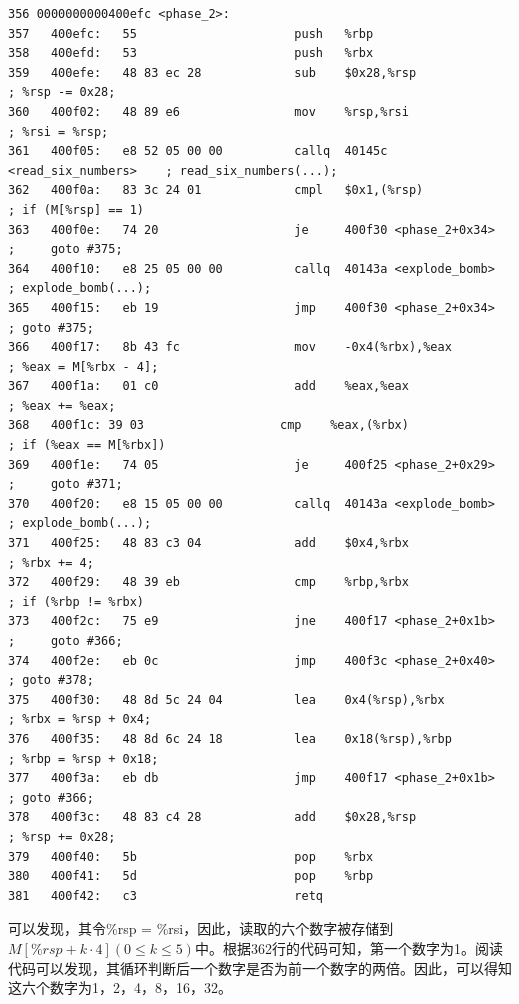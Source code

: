\documentclass{article}
\begin{document}
\begin{lstlisting}[title = phase\_2反汇编代码及注释, xleftmargin = 2em,xrightmargin = 2em, aboveskip = 1em, numbers = none, basicstyle=\footnotesize\ttfamily]
356 0000000000400efc <phase_2>:
357   400efc:   55                      push   %rbp
358   400efd:   53                      push   %rbx
359   400efe:   48 83 ec 28             sub    $0x28,%rsp                   ; %rsp -= 0x28;
360   400f02:   48 89 e6                mov    %rsp,%rsi                    ; %rsi = %rsp;
361   400f05:   e8 52 05 00 00          callq  40145c <read_six_numbers>    ; read_six_numbers(...);
362   400f0a:   83 3c 24 01             cmpl   $0x1,(%rsp)                  ; if (M[%rsp] == 1)
363   400f0e:   74 20                   je     400f30 <phase_2+0x34>        ;     goto #375;
364   400f10:   e8 25 05 00 00          callq  40143a <explode_bomb>        ; explode_bomb(...);
365   400f15:   eb 19                   jmp    400f30 <phase_2+0x34>        ; goto #375;
366   400f17:   8b 43 fc                mov    -0x4(%rbx),%eax              ; %eax = M[%rbx - 4];
367   400f1a:   01 c0                   add    %eax,%eax                    ; %eax += %eax;
368   400f1c: 39 03                   cmp    %eax,(%rbx)                  ; if (%eax == M[%rbx])
369   400f1e:   74 05                   je     400f25 <phase_2+0x29>        ;     goto #371;
370   400f20:   e8 15 05 00 00          callq  40143a <explode_bomb>        ; explode_bomb(...);
371   400f25:   48 83 c3 04             add    $0x4,%rbx                    ; %rbx += 4;
372   400f29:   48 39 eb                cmp    %rbp,%rbx                    ; if (%rbp != %rbx)
373   400f2c:   75 e9                   jne    400f17 <phase_2+0x1b>        ;     goto #366;
374   400f2e:   eb 0c                   jmp    400f3c <phase_2+0x40>        ; goto #378;
375   400f30:   48 8d 5c 24 04          lea    0x4(%rsp),%rbx               ; %rbx = %rsp + 0x4;
376   400f35:   48 8d 6c 24 18          lea    0x18(%rsp),%rbp              ; %rbp = %rsp + 0x18;
377   400f3a:   eb db                   jmp    400f17 <phase_2+0x1b>        ; goto #366;
378   400f3c:   48 83 c4 28             add    $0x28,%rsp                   ; %rsp += 0x28;
379   400f40:   5b                      pop    %rbx
380   400f41:   5d                      pop    %rbp
381   400f42:   c3                      retq
\end{lstlisting}

可以发现，其令\%rsp = \%rsi，因此，读取的六个数字被存储到$M[\%rsp + k\cdot 4]\left( 0 \le k \le 5 \right) $中。根据362行的代码可知，第一个数字为1。阅读代码可以发现，其循环判断后一个数字是否为前一个数字的两倍。因此，可以得知这六个数字为1，2，4，8，16，32。
\end{document}
